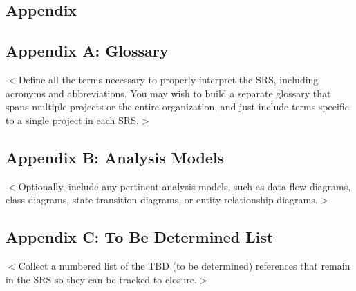 \begin{appendices} 
	\chapter{Appendix} \label{chp:appendix}
	\section{Appendix A: Glossary}
	$<$Define all the terms necessary to properly interpret the SRS, including 
	acronyms and abbreviations. You may wish to build a separate glossary that spans 
	multiple projects or the entire organization, and just include terms specific to 
	a single project in each SRS.$>$
	
	\section{Appendix B: Analysis Models}
	$<$Optionally, include any pertinent analysis models, such as data flow 
	diagrams, class diagrams, state-transition diagrams, or entity-relationship 
	diagrams.$>$
	
	\section{Appendix C: To Be Determined List}
	$<$Collect a numbered list of the TBD (to be determined) references that remain 
	in the SRS so they can be tracked to closure.$>$
\end{appendices}